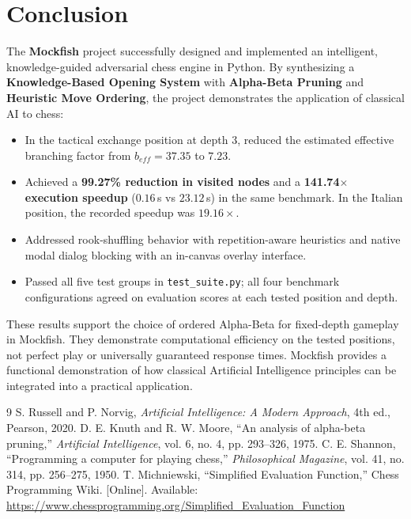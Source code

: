 \documentclass[11pt,a4paper]{article}
\begin{document}
\section{Conclusion}
The \textbf{Mockfish} project successfully designed and implemented an intelligent, knowledge-guided adversarial chess engine in Python. By synthesizing a \textbf{Knowledge-Based Opening System} with \textbf{Alpha-Beta Pruning} and \textbf{Heuristic Move Ordering}, the project demonstrates the application of classical AI to chess:
\begin{itemize}[leftmargin=*]
    \item In the tactical exchange position at depth 3, reduced the estimated effective branching factor from $b_{eff}=37.35$ to $7.23$.
    \item Achieved a \textbf{99.27\% reduction in visited nodes} and a \textbf{141.74$\times$ execution speedup} ($0.16$\,s vs $23.12$\,s) in the same benchmark. In the Italian position, the recorded speedup was $19.16\times$.
    \item Addressed rook-shuffling behavior with repetition-aware heuristics and native modal dialog blocking with an in-canvas overlay interface.
    \item Passed all five test groups in \texttt{test\_suite.py}; all four benchmark configurations agreed on evaluation scores at each tested position and depth.
\end{itemize}
These results support the choice of ordered Alpha-Beta for fixed-depth gameplay in Mockfish. They demonstrate computational efficiency on the tested positions, not perfect play or universally guaranteed response times. Mockfish provides a functional demonstration of how classical Artificial Intelligence principles can be integrated into a practical application.
\begin{thebibliography}{9}
 S. Russell and P. Norvig, \textit{Artificial Intelligence: A Modern Approach}, 4th ed., Pearson, 2020.
 D. E. Knuth and R. W. Moore, ``An analysis of alpha-beta pruning,'' \textit{Artificial Intelligence}, vol. 6, no. 4, pp. 293--326, 1975.
 C. E. Shannon, ``Programming a computer for playing chess,'' \textit{Philosophical Magazine}, vol. 41, no. 314, pp. 256--275, 1950.
 T. Michniewski, ``Simplified Evaluation Function,'' Chess Programming Wiki. [Online]. Available: \url{https://www.chessprogramming.org/Simplified_Evaluation_Function}
\end{thebibliography}
\end{document}
